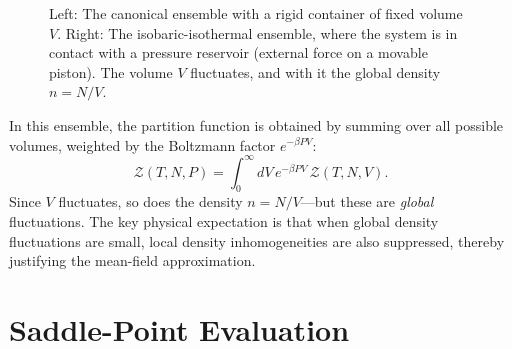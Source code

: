 \begin{figure}[htbp]
    \caption{Left: The canonical ensemble with a rigid container of fixed volume $V$. Right: The isobaric-isothermal ensemble, where the system is in contact with a pressure reservoir (external force on a movable piston). The volume $V$ fluctuates, and with it the global density $n = N/V$.}
\end{figure}

In this ensemble, the partition function is obtained by summing over all possible volumes, weighted by the Boltzmann factor $e^{-\beta P V}$:
\begin{equation}
    \mathcal{Z}(T, N, P) = \int_0^\infty dV \, e^{-\beta P V} \, \mathcal{Z}(T, N, V).
\end{equation}
Since $V$ fluctuates, so does the density $n = N/V$---but these are \emph{global} fluctuations. The key physical expectation is that when global density fluctuations are small, local density inhomogeneities are also suppressed, thereby justifying the mean-field approximation.

\section{Saddle-Point Evaluation}

